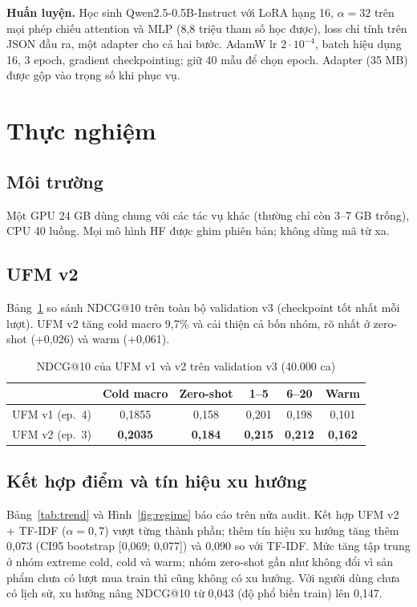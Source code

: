 \documentclass[conference,a4paper]{IEEEtran}
\begin{document}
\textbf{Huấn luyện.} Học sinh Qwen2.5-0.5B-Instruct với LoRA \cite{hu2022lora} hạng 16, $\alpha=32$ trên mọi phép chiếu attention và MLP (8,8 triệu tham số học được), loss chỉ tính trên JSON đầu ra, một adapter cho cả hai bước. AdamW lr $2\cdot10^{-4}$, batch hiệu dụng 16, 3 epoch, gradient checkpointing; giữ 40 mẫu để chọn epoch. Adapter (35 MB) được gộp vào trọng số khi phục vụ.

\section{Thực nghiệm}
\subsection{Môi trường}
Một GPU 24 GB dùng chung với các tác vụ khác (thường chỉ còn 3--7 GB trống), CPU 40 luồng. Mọi mô hình HF được ghim phiên bản; không dùng mã từ xa.

\subsection{UFM v2}
Bảng~\ref{tab:ufm} so sánh NDCG@10 trên toàn bộ validation v3 (checkpoint tốt nhất mỗi lượt). UFM v2 tăng cold macro 9,7\% và cải thiện cả bốn nhóm, rõ nhất ở zero-shot (+0,026) và warm (+0,061).

\begin{table}[t]
\caption{NDCG@10 của UFM v1 và v2 trên validation v3 (40.000 ca)}
\label{tab:ufm}
\centering
\begin{tabular}{lccccc}
\toprule
 & Cold macro & Zero-shot & 1--5 & 6--20 & Warm\\
\midrule
UFM v1 (ep.~4) & 0,1855 & 0,158 & 0,201 & 0,198 & 0,101\\
UFM v2 (ep.~3) & \textbf{0,2035} & \textbf{0,184} & \textbf{0,215} & \textbf{0,212} & \textbf{0,162}\\
\bottomrule
\end{tabular}
\end{table}

\subsection{Kết hợp điểm và tín hiệu xu hướng}
Bảng~\ref{tab:trend} và Hình~\ref{fig:regime} báo cáo trên nửa audit. Kết hợp UFM v2 + TF-IDF ($\alpha=0{,}7$) vượt từng thành phần; thêm tín hiệu xu hướng tăng thêm 0,073 (CI95 bootstrap [0,069; 0,077]) và 0,090 so với TF-IDF. Mức tăng tập trung ở nhóm extreme cold, cold và warm; nhóm zero-shot gần như không đổi vì sản phẩm chưa có lượt mua train thì cũng không có xu hướng. Với người dùng chưa có lịch sử, xu hướng nâng NDCG@10 từ 0,043 (độ phổ biến train) lên 0,147.
\end{document}
